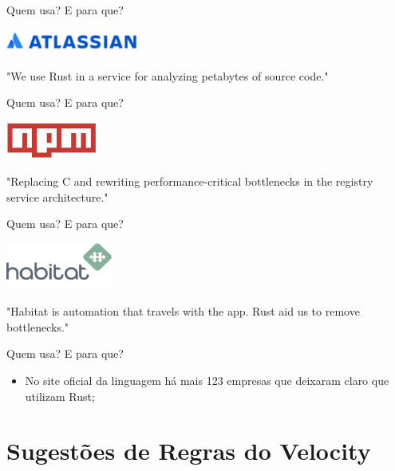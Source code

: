 \documentclass[aspectratio=169]{beamer}
\begin{document}
\begin{frame}{Quem usa? E para que?}
	\begin{center}
		\includegraphics[width=4.5cm]{imgs/atlassian.png}	
		
		"We use Rust in a service for analyzing petabytes of source code."
	\end{center}
\end{frame}

\begin{frame}{Quem usa? E para que?}
	\begin{center}
		\includegraphics[width=3.0cm]{imgs/npm.jpeg}	
		
		"Replacing C and rewriting performance-critical bottlenecks in the registry service architecture."
	\end{center}
\end{frame}

\begin{frame}{Quem usa? E para que?}
	\begin{center}
		\includegraphics[width=3.5cm]{imgs/habitat.png}	
		
		"Habitat is automation that travels with the app. Rust aid us to remove bottlenecks."
	\end{center}
\end{frame}

\begin{frame}{Quem usa? E para que?}
	\begin{itemize}
		\item No site oficial da linguagem há mais 123 empresas que deixaram claro que utilizam Rust;
	\end{itemize}
\end{frame}

\section{Sugestões de Regras do Velocity}
\end{document}

